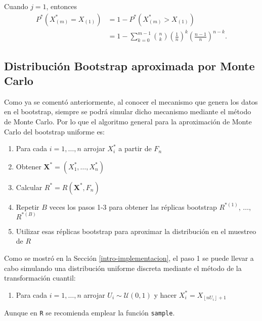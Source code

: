 \documentclass[
]{book}
\providecommand{\tightlist}{%
  \setlength{\itemsep}{0pt}\setlength{\parskip}{0pt}}
\theoremstyle{break}
\theoremstyle{definition}
\theoremstyle{definition}
\theoremstyle{definition}
\theoremstyle{definition}
\theoremstyle{remark}
\begin{document}
Cuando \(j=1\), entonces
\[\begin{aligned}
P^{\ast}\left( X_{(m)}^{\ast} = X_{(1)} \right)
&= 1-P^{\ast}\left( X_{(m)}^{\ast}>X_{(1)} \right) \\
&=  1-\sum_{k=0}^{m-1}\binom{n}{k}\left( \frac{1}{n} \right)^{k}
\left( \frac{n-1}{n} \right)^{n-k}.
\end{aligned}\]

\hypertarget{distribuciuxf3n-bootstrap-aproximada-por-monte-carlo}{%
\subsection{Distribución Bootstrap aproximada por Monte Carlo}\label{distribuciuxf3n-bootstrap-aproximada-por-monte-carlo}}

Como ya se comentó anteriormente,
al conocer el mecanismo que genera los datos en el bootstrap,
siempre se podrá simular dicho mecanismo mediante el método de Monte
Carlo. Por lo que el algoritmo general para la aproximación de Monte Carlo del
bootstrap uniforme es:

\begin{enumerate}
\def\labelenumi{\arabic{enumi}.}
\item
  Para cada \(i=1,\ldots ,n\) arrojar \(X_i^{\ast}\) a partir de \(F_n\)
\item
  Obtener \(\mathbf{X}^{\ast}=\left( X_1^{\ast},\ldots ,X_n^{\ast} \right)\)
\item
  Calcular \(R^{\ast}=R\left( \mathbf{X}^{\ast},F_n \right)\)
\item
  Repetir \(B\) veces los pasos 1-3 para obtener las réplicas bootstrap
  \(R^{\ast (1)}\), \(\ldots\), \(R^{\ast (B)}\)
\item
  Utilizar esas réplicas bootstrap para aproximar la distribución en el
  muestreo de \(R\)
\end{enumerate}

Como se mostró en la Sección \ref{intro-implementacion}, el paso 1 se puede llevar a cabo simulando una distribución uniforme discreta
mediante el método de la transformación cuantil:

\begin{enumerate}
\def\labelenumi{\arabic{enumi}.}
\tightlist
\item
  Para cada \(i=1,\ldots ,n\) arrojar \(U_i\sim \mathcal{U}\left( 0,1 \right)\) y
  hacer \(X_i^{\ast}=X_{\left\lfloor nU_i\right\rfloor +1}\)
\end{enumerate}

Aunque en \texttt{R} se recomienda emplear la función \texttt{sample}.
\end{document}
